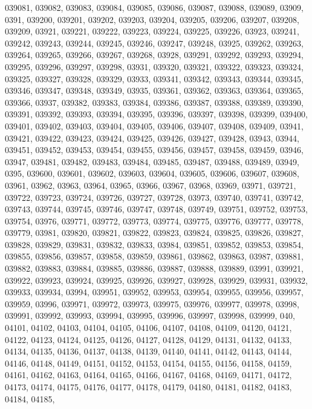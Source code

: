 {039081,
039082,
039083,
039084,
039085,
039086,
039087,
039088,
039089,
03909,
0391,
039200,
039201,
039202,
039203,
039204,
039205,
039206,
039207,
039208,
039209,
03921,
039221,
039222,
039223,
039224,
039225,
039226,
03923,
039241,
039242,
039243,
039244,
039245,
039246,
039247,
039248,
03925,
039262,
039263,
039264,
039265,
039266,
039267,
039268,
03928,
039291,
039292,
039293,
039294,
039295,
039296,
039297,
039298,
03931,
039320,
039321,
039322,
039323,
039324,
039325,
039327,
039328,
039329,
03933,
039341,
039342,
039343,
039344,
039345,
039346,
039347,
039348,
039349,
03935,
039361,
039362,
039363,
039364,
039365,
039366,
03937,
039382,
039383,
039384,
039386,
039387,
039388,
039389,
039390,
039391,
039392,
039393,
039394,
039395,
039396,
039397,
039398,
039399,
039400,
039401,
039402,
039403,
039404,
039405,
039406,
039407,
039408,
039409,
03941,
039421,
039422,
039423,
039424,
039425,
039426,
039427,
039428,
03943,
03944,
039451,
039452,
039453,
039454,
039455,
039456,
039457,
039458,
039459,
03946,
03947,
039481,
039482,
039483,
039484,
039485,
039487,
039488,
039489,
03949,
0395,
039600,
039601,
039602,
039603,
039604,
039605,
039606,
039607,
039608,
03961,
03962,
03963,
03964,
03965,
03966,
03967,
03968,
03969,
03971,
039721,
039722,
039723,
039724,
039726,
039727,
039728,
03973,
039740,
039741,
039742,
039743,
039744,
039745,
039746,
039747,
039748,
039749,
039751,
039752,
039753,
039754,
03976,
039771,
039772,
039773,
039774,
039775,
039776,
039777,
039778,
039779,
03981,
039820,
039821,
039822,
039823,
039824,
039825,
039826,
039827,
039828,
039829,
039831,
039832,
039833,
03984,
039851,
039852,
039853,
039854,
039855,
039856,
039857,
039858,
039859,
039861,
039862,
039863,
03987,
039881,
039882,
039883,
039884,
039885,
039886,
039887,
039888,
039889,
03991,
039921,
039922,
039923,
039924,
039925,
039926,
039927,
039928,
039929,
039931,
039932,
039933,
039934,
03994,
039951,
039952,
039953,
039954,
039955,
039956,
039957,
039959,
03996,
039971,
039972,
039973,
039975,
039976,
039977,
039978,
03998,
039991,
039992,
039993,
039994,
039995,
039996,
039997,
039998,
039999,
040,
04101,
04102,
04103,
04104,
04105,
04106,
04107,
04108,
04109,
04120,
04121,
04122,
04123,
04124,
04125,
04126,
04127,
04128,
04129,
04131,
04132,
04133,
04134,
04135,
04136,
04137,
04138,
04139,
04140,
04141,
04142,
04143,
04144,
04146,
04148,
04149,
04151,
04152,
04153,
04154,
04155,
04156,
04158,
04159,
04161,
04162,
04163,
04164,
04165,
04166,
04167,
04168,
04169,
04171,
04172,
04173,
04174,
04175,
04176,
04177,
04178,
04179,
04180,
04181,
04182,
04183,
04184,
04185,
}
